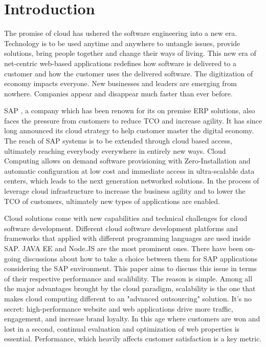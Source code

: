 \chapter{Introduction}
The promise of cloud has ushered the software engineering into a new era. Technology is to be used anytime and anywhere to untangle issues, provide solutions, bring people together and change their ways of living. This new era of net-centric web-based applications redefines how software is delivered to a customer and how the customer uses the delivered software. The digitization of economy impacts everyone. New businesses and leaders are emerging from nowhere. Companies appear and disappear much faster than ever before. 

SAP , a company which has been renown for its on premise ERP solutions, also faces the pressure from customers to reduce TCO and increase agility. It has since long announced its cloud strategy to help customer master the digital economy. The reach of SAP systems is to be extended through cloud based access, ultimately reaching everybody everywhere in entirely new ways. Cloud Computing allows on demand software provisioning with Zero-Installation and automatic configuration at low cost and immediate access in ultra-scalable data centers, which leads to the next generation networked solutions. In the process of leverage cloud infrastructure to increase the business agility and to lower the TCO of customers, ultimately new types of applications are enabled.

Cloud solutions come with new capabilities and technical challenges for cloud software development.  Different cloud software development platforms and frameworks that applied with different programming languages are used inside SAP. JAVA EE and Node.JS are the most prominent ones. There have been on-going discussions about how to  take a choice between them for SAP applications considering the SAP environment. This paper aims to discuss this issue in terms of their respective performance and scalibility. The reason is simple. Among all the major advantages brought by the cloud paradigm, scalability is the one that makes cloud computing different to an "advanced outsourcing" solution. It’s no secret: high-performance website and web applications drive more traffic, engagement, and increase brand loyalty. In this age where customers are won and lost in a second, continual evaluation and optimization of web properties is essential.  Performance, which heavily affects customer satisfaction is a key metric. \\

